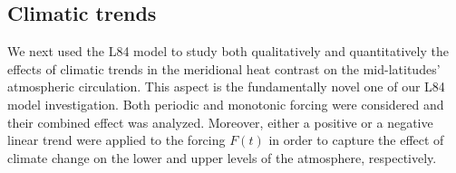 \documentclass[%
 aip, cha,
 amsmath,amssymb,
 reprint,%
author-year,%
]{revtex4-1}
\newcommand{\0}{\mathbf 0}
\begin{document}

\subsection{Climatic trends}
We next used the L84 model to study both qualitatively  and quantitatively the effects of climatic trends in the meridional heat contrast on the mid-latitudes' atmospheric circulation. This aspect is the fundamentally novel one of our L84 model investigation. Both periodic and monotonic forcing were considered and their combined effect was analyzed. Moreover, either a positive or a negative linear trend were applied to the forcing $F(t)$ in order to capture the effect of climate change on the lower and upper levels of the atmosphere, respectively.
\end{document}
